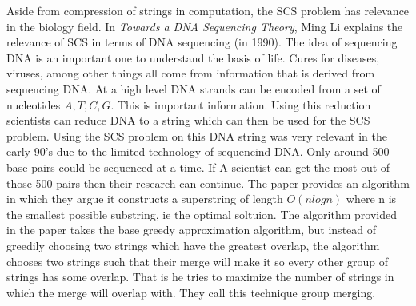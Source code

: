 \documentclass[letterpaper,11pt,titlepage]{article}
\begin{document}
Aside from compression of strings in computation, the SCS problem has relevance in the biology field. In \textit{Towards a DNA Sequencing Theory}, Ming Li explains the relevance of SCS in terms of DNA sequencing (in 1990). The idea of sequencing DNA is an important one to understand the basis of life. Cures for diseases, viruses, among other things all come from information that is derived from sequencing DNA. At a high level DNA strands can be encoded from a set of nucleotides $A, T, C, G$. This is important information. Using this reduction scientists can reduce DNA to a string which can then be used for the SCS problem. Using the SCS problem on this DNA string was very relevant in the early 90's due to the limited technology of sequencind DNA. Only around 500 base pairs could be sequenced at a time. If A scientist can get the most out of those 500 pairs then their research can continue. The paper provides an algorithm in which they argue it constructs a superstring of length $O(nlogn)$ where n is the smallest possible substring, ie the optimal soltuion. The algorithm provided in the paper takes the base greedy approximation algorithm, but instead of greedily choosing two strings which have the greatest overlap, the algorithm chooses two strings such that their merge will make it so every other group of strings has some overlap. That is he tries to maximize the number of strings in which the merge will overlap with. They call this technique group merging.\\


\newpage

{
  \small 
  
  
}
\end{document}
